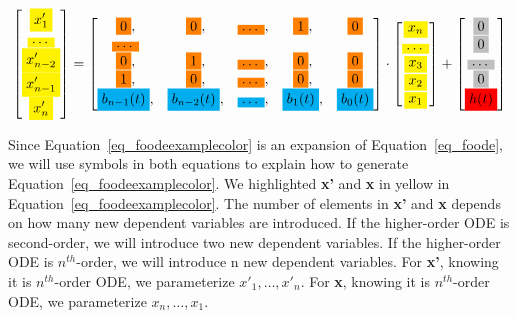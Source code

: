 \begin{equation} \label{eq_foodeexamplecolor}
	\begin{bmatrix}
		\highlight{yellow}{x_{1}'} \\
    \highlight{yellow}{\dots} \\
    \highlight{yellow}{x_{n-2}'} \\
    \highlight{yellow}{x_{n-1}'} \\
    \highlight{yellow}{x_{n}'}
	\end{bmatrix}
    = 
  \begin{bmatrix}
		\highlight{orange}{0}, & \highlight{orange}{0}, & \highlight{orange}{\dots}, & \highlight{orange}{1}, & \highlight{orange}{0} \\
    \highlight{orange}{\dots} \\
    \highlight{orange}{0}, & \highlight{orange}{1}, & \highlight{orange}{\dots}, & \highlight{orange}{0}, & \highlight{orange}{0} \\
    \highlight{orange}{1}, & \highlight{orange}{0}, & \highlight{orange}{\dots}, & \highlight{orange}{0}, & \highlight{orange}{0} \\
    \highlight{cyan}{b_{n-1}(t)}, & \highlight{cyan}{b_{n-2}(t)}, & \highlight{cyan}{\dots}, & \highlight{cyan}{b_{1}(t)}, & \highlight{cyan}{b_{0}(t)}
	\end{bmatrix}
    \cdot
  \begin{bmatrix}
    \highlight{yellow}{x_{n}} \\
    \highlight{yellow}{\dots} \\
    \highlight{yellow}{x_{3}} \\
		\highlight{yellow}{x_{2}} \\
    \highlight{yellow}{x_{1}}
	\end{bmatrix}
    + 
  \begin{bmatrix}
    \highlight{lightgray}{0} \\
    \highlight{lightgray}{0} \\
    \highlight{lightgray}{\dots} \\
    \highlight{lightgray}{0} \\
    \highlight{red}{h(t)}
	\end{bmatrix}
\end{equation}

Since Equation~\ref{eq_foodeexamplecolor} is an expansion of Equation~\ref{eq_foode}, we will use symbols in both equations to explain how to generate Equation~\ref{eq_foodeexamplecolor}. We highlighted \textbf{x'} and \textbf{x} in yellow in Equation~\ref{eq_foodeexamplecolor}. The number of elements in \textbf{x'} and \textbf{x} depends on how many new dependent variables are introduced. If the higher-order ODE is second-order, we will introduce two new dependent variables. If the higher-order ODE is $n^{th}$-order, we will introduce n new dependent variables. For \textbf{x'}, knowing it is $n^{th}$-order ODE, we parameterize $x'_{1}, \dots, x'_{n}$. For \textbf{x}, knowing it is $n^{th}$-order ODE, we parameterize $x_{n}, \dots, x_{1}$.

